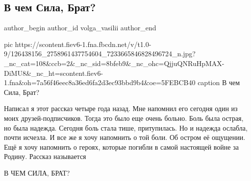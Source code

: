  
 
 
 
 
 
\subsection{В чем Сила, Брат?}
\label{sec:22_11_2020.fb.volga_vasilii.1.v_chem_sila_brat}
\ifcmt
	author_begin
   author_id volga_vasilii
	author_end
\fi

\ifcmt
pic https://scontent.fiev6-1.fna.fbcdn.net/v/t1.0-9/126438156_2758961437754604_7233665846828496724_n.jpg?_nc_cat=108&ccb=2&_nc_sid=8bfeb9&_nc_ohc=QjjuQNRuHpMAX-DiMU8&_nc_ht=scontent.fiev6-1.fna&oh=7a56f46eec8a36ed6fa2d3ec93bbd9b4&oe=5FEBCB40
caption В чем Сила, Брат?
\fi

\obeycr
Написал я этот рассказ четыре года назад. Мне напомнил его сегодня один из моих друзей-подписчиков. Тогда это было еще очень больно. Боль была острая, но была надежда. 
Сегодня боль стала тише, притупилась.
Но и надежда ослабла, почти исчезла.
И все же я хочу напомнить о той боли. Об остром её ощущении. 
Ещё я хочу напомнить о героях, которые погибли в самой настоящей войне за Родину.
Рассказ называется

В ЧЕМ СИЛА, БРАТ?

